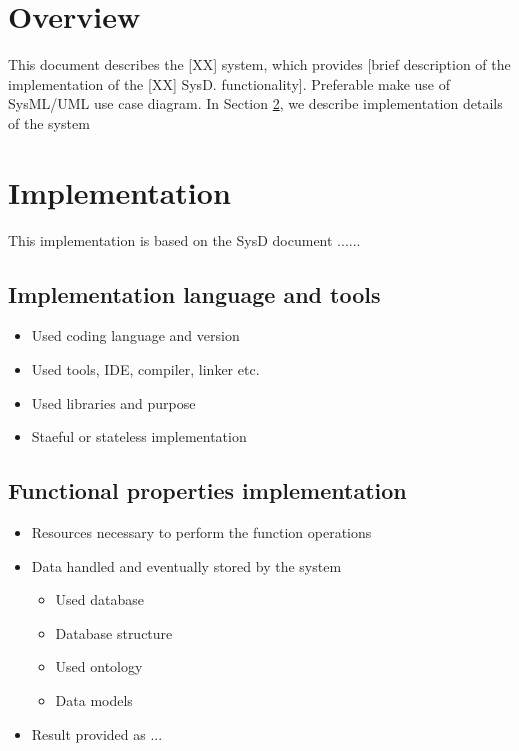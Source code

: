 \documentclass[a4paper]{arrowhead}
\begin{document}
\section{Overview}
\label{sec:overview}
\color{red}
This document describes the [XX] system, which provides [brief
description of the implementation of the [XX] SysD.
functionality]. Preferable make use of SysML/UML 
use case diagram. 
\color{black}
In Section \ref{Implementation}, we describe implementation details of
the system



\newpage

\section{Implementation}
\label{Implementation}

This implementation is based on the SysD document ...... {\cite{.....}}


\subsection {Implementation language and tools}
\color{red}
\begin{itemize}
\item Used coding language and version
\item Used tools, IDE, compiler, linker etc.
\item Used libraries and purpose
\item Staeful or stateless implementation   
\end{itemize} 
\color{black}

\subsection {Functional properties implementation}
\color{red}
  \begin{itemize}
  \item Resources necessary to perform the function operations
  \item Data handled and eventually stored by the system
    \begin{itemize}
    \item Used database
    \item Database structure
    \item Used ontology
    \item Data models
    \end{itemize}
  \item Result provided as ...
  \end{itemize}
\color{black}
\end{document}

